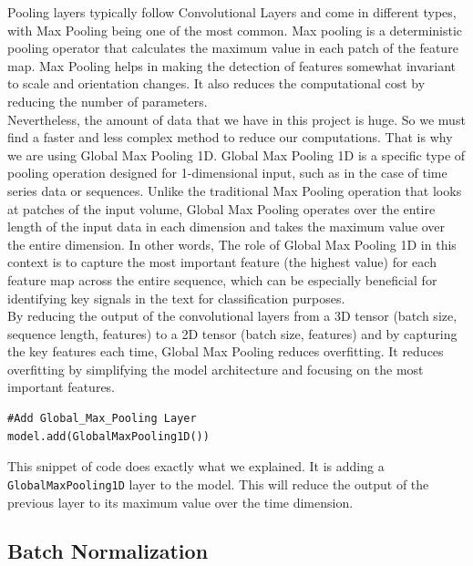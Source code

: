 Pooling layers typically follow Convolutional Layers and come in different types, with Max Pooling being one of the most common. Max pooling is a deterministic pooling operator that calculates the maximum value in each patch of the feature map. Max Pooling helps in making the detection of features somewhat invariant to scale and orientation changes. It also reduces the computational cost by reducing the number of parameters.\\

Nevertheless, the amount of data that we have in this project is huge. So we must find a faster and less complex method to reduce our computations. That is why we are using Global Max Pooling 1D. Global Max Pooling 1D is a specific type of pooling operation designed for 1-dimensional input, such as in the case of time series data or sequences. Unlike the traditional Max Pooling operation that looks at patches of the input volume, Global Max Pooling operates over the entire length of the input data in each dimension and takes the maximum value over the entire dimension. In other words, The role of Global Max Pooling 1D in this context is to capture the most important feature (the highest value) for each feature map across the entire sequence, which can be especially beneficial for identifying key signals in the text for classification purposes.\\
By reducing the output of the convolutional layers from a 3D tensor (batch size, sequence length, features) to a 2D tensor (batch size, features) and by capturing the key features each time, Global Max Pooling reduces overfitting. It reduces overfitting by simplifying the model architecture and focusing on the most important features.\\

\begin{lstlisting}
#Add Global_Max_Pooling Layer
model.add(GlobalMaxPooling1D())
\end{lstlisting}

This snippet of code does exactly what we explained. It is adding a \verb*|GlobalMaxPooling1D| layer to the model. This will reduce the output of the previous layer to its maximum value over the time dimension.


\subsection{Batch Normalization}
